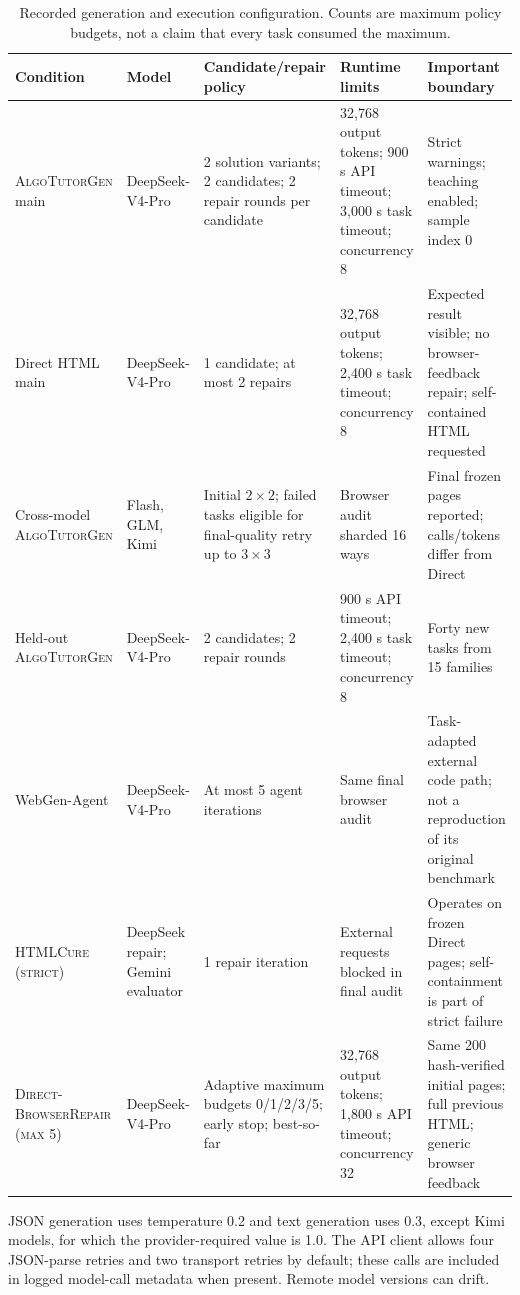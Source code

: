 \documentclass[letterpaper]{article}
\newcommand{\system}{\textsc{AlgoTutorGen}}
\newcommand{\dbr}{\textsc{Direct-BrowserRepair (max 5)}}
\newcommand{\htmlcure}{\textsc{HTMLCure (strict)}}
\begin{document}
\begin{table}[t]
\centering
\small
\setlength{\tabcolsep}{3pt}
\begin{tabular}{@{}p{}p{}p{}p{}p{}@{}}
\toprule
Condition & Model & Candidate/repair policy & Runtime limits & Important boundary \\
\midrule
\system{} main & DeepSeek-V4-Pro & 2 solution variants; 2 candidates; 2 repair rounds per candidate & 32,768 output tokens; 900 s API timeout; 3,000 s task timeout; concurrency 8 & Strict warnings; teaching enabled; sample index 0 \\
Direct HTML main & DeepSeek-V4-Pro & 1 candidate; at most 2 repairs & 32,768 output tokens; 2,400 s task timeout; concurrency 8 & Expected result visible; no browser-feedback repair; self-contained HTML requested \\
Cross-model \system{} & Flash, GLM, Kimi & Initial $2\times2$; failed tasks eligible for final-quality retry up to $3\times3$ & Browser audit sharded 16 ways & Final frozen pages reported; calls/tokens differ from Direct \\
Held-out \system{} & DeepSeek-V4-Pro & 2 candidates; 2 repair rounds & 900 s API timeout; 2,400 s task timeout; concurrency 8 & Forty new tasks from 15 families \\
WebGen-Agent & DeepSeek-V4-Pro & At most 5 agent iterations & Same final browser audit & Task-adapted external code path; not a reproduction of its original benchmark \\
\htmlcure{} & DeepSeek repair; Gemini evaluator & 1 repair iteration & External requests blocked in final audit & Operates on frozen Direct pages; self-containment is part of strict failure \\
\dbr{} & DeepSeek-V4-Pro & Adaptive maximum budgets 0/1/2/3/5; early stop; best-so-far & 32,768 output tokens; 1,800 s API timeout; concurrency 32 & Same 200 hash-verified initial pages; full previous HTML; generic browser feedback \\
\bottomrule
\end{tabular}
\caption{Recorded generation and execution configuration. Counts are maximum policy budgets, not a claim that every task consumed the maximum.}
\label{tab:generation-config}
\end{table}

JSON generation uses temperature 0.2 and text generation uses 0.3, except Kimi models, for which the provider-required value is 1.0. The API client allows four JSON-parse retries and two transport retries by default; these calls are included in logged model-call metadata when present. Remote model versions can drift.
\end{document}
